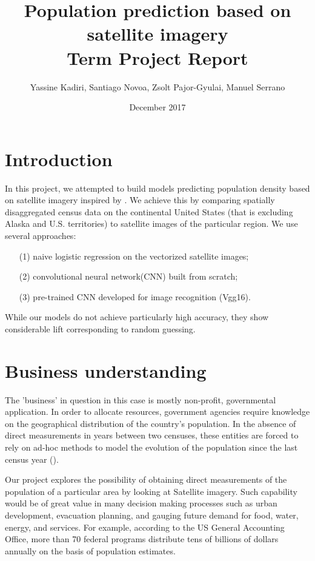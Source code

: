 \documentclass{article}
\begin{document}
\title{Population prediction based on satellite imagery\\
Term Project Report} 

\date{December 2017}
\author{Yassine Kadiri, Santiago Novoa, Zsolt Pajor-Gyulai, Manuel Serrano}
\maketitle

\doublespacing


\section{Introduction}
In this project, we attempted to build models predicting population density based on satellite imagery inspired by \cite{RHD17}. We achieve this by comparing spatially disaggregated census data on the continental United States (that is excluding Alaska and U.S. territories) to satellite images of the particular region. We use several approaches: 
\begin{itemize}
\item[(1)] naive logistic regression on the vectorized satellite images; 
\item[(2)] convolutional neural network(CNN) built from scratch; \item[(3)] pre-trained CNN developed for image recognition (Vgg16).
\end{itemize}

While our models do not achieve particularly high accuracy, they show considerable lift corresponding to random guessing. 

\section{Business understanding}
The 'business' in question in this case is mostly non-profit, governmental application. In order to allocate resources, government agencies require knowledge on the geographical distribution of the country's population. In the absence of direct measurements in years between two censuses, these entities are forced to rely on ad-hoc methods to model the evolution of the population since the last census year (\cite{L96}).

Our project explores the possibility of obtaining direct measurements of the population of a particular area by looking at Satellite imagery. Such capability would be of great value in many decision making processes such as urban development, evacuation planning, and gauging future demand for food, water, energy, and services. For example, according to the US General Accounting Office, more than 70 federal programs distribute tens of billions of dollars annually on the basis of population estimates.
\end{document}
